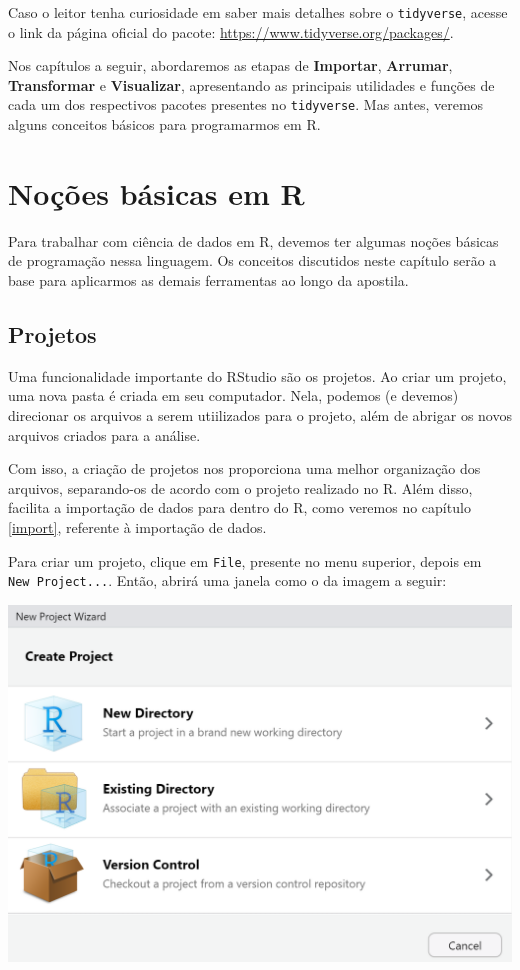 \documentclass[
  brazilian,
]{book}
\begin{document}
Caso o leitor tenha curiosidade em saber mais detalhes sobre o \texttt{tidyverse}, acesse o link da página oficial do pacote: \url{https://www.tidyverse.org/packages/}.

Nos capítulos a seguir, abordaremos as etapas de \textbf{Importar}, \textbf{Arrumar}, \textbf{Transformar} e \textbf{Visualizar}, apresentando as principais utilidades e funções de cada um dos respectivos pacotes presentes no \texttt{tidyverse}. Mas antes, veremos alguns conceitos básicos para programarmos em R.

\hypertarget{nouxe7uxf5es-buxe1sicas-em-r}{%
\chapter{Noções básicas em R}\label{nouxe7uxf5es-buxe1sicas-em-r}}

Para trabalhar com ciência de dados em R, devemos ter algumas noções básicas de programação nessa linguagem. Os conceitos discutidos neste capítulo serão a base para aplicarmos as demais ferramentas ao longo da apostila.

\hypertarget{proj}{%
\section{Projetos}\label{proj}}

Uma funcionalidade importante do RStudio são os projetos. Ao criar um projeto, uma nova pasta é criada em seu computador. Nela, podemos (e devemos) direcionar os arquivos a serem utiilizados para o projeto, além de abrigar os novos arquivos criados para a análise.

Com isso, a criação de projetos nos proporciona uma melhor organização dos arquivos, separando-os de acordo com o projeto realizado no R. Além disso, facilita a importação de dados para dentro do R, como veremos no capítulo \ref{import}, referente à importação de dados.

Para criar um projeto, clique em \texttt{File}, presente no menu superior, depois em \texttt{New\ Project...}. Então, abrirá uma janela como o da imagem a seguir:

\begin{center}\includegraphics[width=0.5\linewidth]{imagens/criar_projeto} \end{center}
\end{document}
